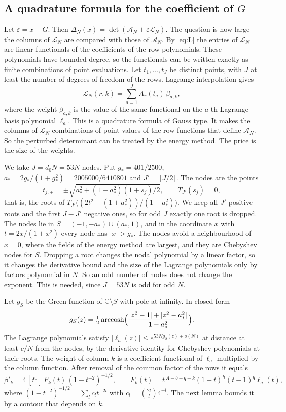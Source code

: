 \documentclass[11pt]{amsart}
\theoremstyle{definition}
\theoremstyle{remark}
\numberwithin{equation}{section}
\newcommand{\C}{\mathbb C}
\newcommand{\cA}{\mathcal A}
\newcommand{\cL}{\mathcal L}
\begin{document}
\subsection{A quadrature formula for the coefficient of $G$}\label{ssec:quadrature}
Let $\varepsilon=x-G$. Then $\Delta_N(x)=\det(\cA_N+\varepsilon\cL_N)$. The question is how large the columns
of $\cL_N$ are compared with those of $\cA_N$. By \eqref{eq:L} the entries of $\cL_N$ are linear
functionals of the coefficients of the row polynomials. These polynomials have bounded degree, so the
functionals can be written exactly as finite combinations of point evaluations. Let $t_1,\ldots,t_J$ be
distinct points, with $J$ at least the number of degrees of freedom of the rows. Lagrange interpolation
gives
\begin{equation}\label{eq:quad}
 \cL_N(r,k)=\sum_{a=1}^JA_r(t_a)\,\beta_{a,k},
\end{equation}
where the weight $\beta_{a,k}$ is the value of the same functional on the $a$-th Lagrange basis polynomial
$\ell_a$. This is a quadrature formula of Gauss type. It makes the columns of $\cL_N$ combinations of point
values of the row functions that define $\cA_N$. So the perturbed determinant can be treated by the energy
method. The price is the size of the weights.

We take $J=d_0N=53N$ nodes. Put $g_*=401/2500$, $a_*=2g_*/(1+g_*^2)=2005000/6410801$ and $J'=\lceil J/2\rceil$.
The nodes are the points
\[
 t_{j,\pm}=\pm\sqrt{a_*^2+(1-a_*^2)(1+s_j)/2},\qquad T_{J'}(s_j)=0,
\]
that is, the roots of $T_{J'}\bigl((2t^2-(1+a_*^2))/(1-a_*^2)\bigr)$. We keep all $J'$ positive roots and the
first $J-J'$ negative ones, so for odd $J$ exactly one root is dropped. The nodes lie in
$S=(-1,-a_*)\cup(a_*,1)$, and in the coordinate $x$ with $t=2x/(1+x^2)$ every node has $|x|>g_*$. The nodes
avoid a neighbourhood of $x=0$, where the fields of the energy method are largest, and they are Chebyshev
nodes for $S$. Dropping a root changes the nodal polynomial by a linear factor, so it changes the
derivative bound and the size of the Lagrange polynomials only by factors polynomial in $N$. So an odd
number of nodes does not change the exponent. This is needed, since $J=53N$ is odd for odd $N$.

Let $g_S$ be the Green function of $\C\setminus\bar S$ with pole at infinity. In closed form
\[
 g_S(z)=\tfrac12\operatorname{arccosh}\Bigl(\frac{|z^2-1|+|z^2-a_*^2|}{1-a_*^2}\Bigr).
\]
The Lagrange polynomials satisfy $|\ell_a(z)|\le e^{53Ng_S(z)+o(N)}$ at distance at least $c/N$ from the
nodes, by the derivative identity for Chebyshev polynomials at their roots. The weight of column $k$ is a
coefficient functional of $\ell_a$ multiplied by the column function. After removal of the common factor of
the rows it equals
\[
 \beta'_k=4\,[t^0]\,F_k(t)\,(1-t^{-2})^{-1/2},\qquad F_k(t)=t^{\,A-b-q-k}(1-t)^h(t-1)^q\ell_a(t),
\]
where $(1-t^{-2})^{-1/2}=\sum_lc_lt^{-2l}$ with $c_l=\binom{2l}l4^{-l}$. The next lemma bounds it by a contour
that depends on $k$.
\end{document}

